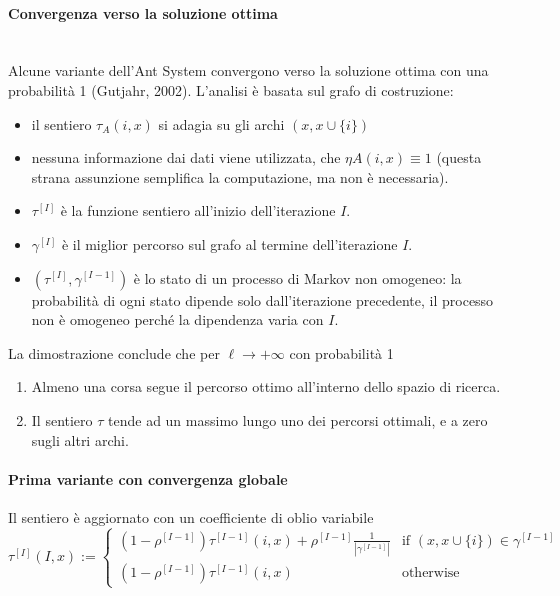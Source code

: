 \documentclass{article}
\begin{document}
\paragraph{Convergenza verso la soluzione ottima}\mbox{}\\
Alcune variante dell'Ant System convergono verso la soluzione ottima con una probabilità
1 (Gutjahr, 2002). L'analisi è basata sul grafo di costruzione:
\begin{itemize}
    \item il sentiero $\tau_A(i,x)$ si adagia su gli archi $(x,x\cup\{i\})$
    \item nessuna informazione dai dati viene utilizzata, che $\eta A(i,x)\equiv 1$
          (questa strana assunzione semplifica la computazione, ma non è necessaria).
    \item $\tau^{[I]}$ è la funzione sentiero all'inizio dell'iterazione $I$.
    \item $\gamma^{[I]}$ è il miglior percorso sul grafo al termine dell'iterazione $I$.
    \item $(\tau^{[I]},\gamma^{[I-1]})$ è lo stato di un processo di Markov non omogeneo:
          la probabilità di ogni stato dipende solo dall'iterazione precedente, il processo
          non è omogeneo perché la dipendenza varia con $I$.
\end{itemize}

La dimostrazione conclude che per $\ell\rightarrow +\infty$ con probabilità 1
\begin{enumerate}
    \item Almeno una corsa segue il percorso ottimo all'interno dello spazio di ricerca.
    \item Il sentiero $\tau$ tende ad un massimo lungo uno dei percorsi ottimali, e a zero
          sugli altri archi.
\end{enumerate}

\paragraph{Prima variante con convergenza globale}
Il sentiero è aggiornato con un coefficiente di oblio variabile
\[
    \tau^{[I]}(I,x):=
    \begin{cases}
        (1-\rho^{[I-1]})\tau^{[I-1]}(i,x)+\rho^{[I-1]}\frac{1}{|\gamma^{[I-1]}|} & \text{if }(x,x\cup \{ i\})\in\gamma^{[I-1]} \\
        (1-\rho^{[I-1]})\tau^{[I-1]}(i,x)                                        & \text{otherwise}
    \end{cases}
\]
\end{document}
